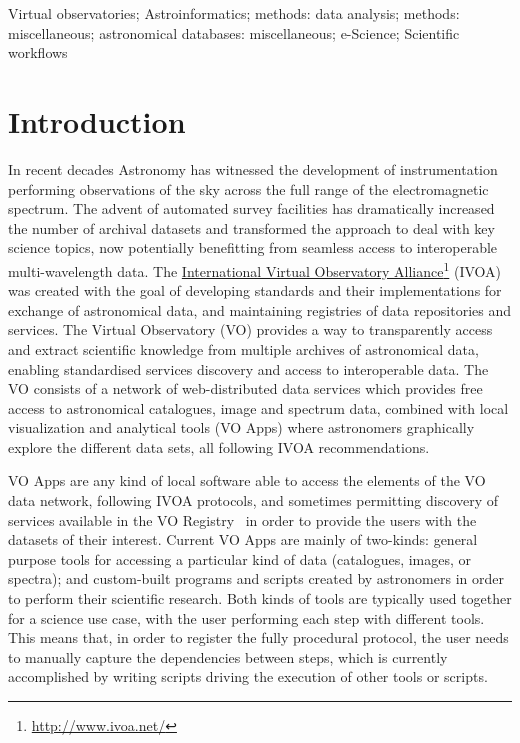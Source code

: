 \documentclass[final,authoryear,5p,times,twocolumn]{elsarticle}
\newcommand{\urlsamefont}[1]{\urlstyle{same}\url{#1}}
\newcommand{\hrefnote}[2]{\href{#1}{#2}\footnote{\urlsamefont{#1}}}
\begin{document}
\begin{frontmatter}
\begin{keyword}
Virtual observatories; Astroinformatics; methods: data analysis; methods: miscellaneous; astronomical databases: miscellaneous; e-Science; Scientific workflows
\end{keyword}

\end{frontmatter}

\section{Introduction}
\label{Introduction}

In recent decades Astronomy has witnessed the development of instrumentation performing observations of the sky across the full range of the electromagnetic spectrum. The advent of automated survey facilities has dramatically increased the number of archival datasets and transformed the approach to deal with key science topics, now potentially benefitting from seamless access to interoperable multi-wavelength data. The \hrefnote{http://www.ivoa.net/}{International Virtual  Observatory Alliance} (IVOA) was created with the goal of developing standards and their implementations for exchange of astronomical data, and maintaining registries of data repositories and services. The Virtual Observatory (VO) provides a way to transparently access and extract scientific knowledge from multiple archives of astronomical data, enabling standardised services discovery and access to interoperable data.  The VO consists of a network of web-distributed data services which provides free access to astronomical catalogues, image and spectrum data, combined with local visualization and analytical tools (VO Apps) where astronomers graphically explore the different data sets, all following IVOA recommendations.

VO Apps are any kind of local software able to access the elements of the VO data network, following IVOA protocols, and sometimes permitting discovery of services available in the VO Registry~\citep{Benson2009} in order to provide the users with the datasets of their interest. Current VO Apps are mainly of two-kinds: general purpose tools for accessing a particular kind of data (catalogues, images, or spectra); and custom-built programs and scripts created by astronomers in order to perform their scientific research. Both kinds of tools are typically used together for a science use case, with the user performing each step with different tools. This means that, in order to register the fully procedural protocol, the user needs to manually capture the dependencies between steps, which is currently accomplished by writing scripts driving the execution of other tools or scripts.
\end{document}
